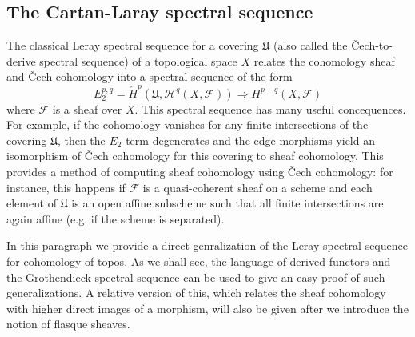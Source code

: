 \subsection{The Cartan-Laray spectral sequence}
The classical Leray spectral sequence for a covering $\mathfrak{U}$ (also called the \v{C}ech-to-derive spectral sequence) of a topological space $X$ relates the cohomology sheaf and \v{C}ech cohomology into a spectral sequence of the form
\begin{equation*}
E_2^{p,q}=\check{H}^p(\mathfrak{U},\mathcal{H}^q(X,\mathscr{F}))\Rightarrow H^{p+q}(X,\mathscr{F})
\end{equation*}
where $\mathscr{F}$ is a sheaf over $X$. This spectral sequence has many useful concequences. For example, if the cohomology vanishes for any finite intersections of the covering $\mathfrak{U}$, then the $E_2$-term degenerates and the edge morphisms yield an isomorphism of \v{C}ech cohomology for this covering to sheaf cohomology. This provides a method of computing sheaf cohomology using \v{C}ech cohomology: for instance, this happens if $\mathscr{F}$ is a quasi-coherent sheaf on a scheme and each element of $\mathfrak{U}$ is an open affine subscheme such that all finite intersections are again affine (e.g. if the scheme is separated).\par
In this paragraph we provide a direct genralization of the Leray spectral sequence for cohomology of topos. As we shall see, the language of derived functors and the Grothendieck spectral sequence can be used to give an easy proof of such generalizations. A relative version of this, which relates the sheaf cohomology with higher direct images of a morphism, will also be given after we introduce the notion of flasque sheaves.

